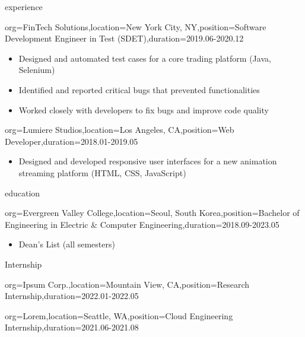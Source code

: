 \documentclass{resume}
\begin{document}
\begin{ResumeSection}{experience}
    \begin{ResumeSubsection}{org=FinTech Solutions,location={New York City, NY},position={Software Development Engineer in Test (SDET)},duration={2019.06-2020.12}}
        \begin{itemize}
            \item Designed and automated test cases for a core trading platform (Java, Selenium)  %
            \item Identified and reported critical bugs that prevented functionalities  %
            \item Worked closely with developers to fix bugs and improve code quality  %
        \end{itemize}
    \end{ResumeSubsection}
    \begin{ResumeSubsection}{org=Lumiere Studios,location={Los Angeles, CA},position={Web Developer},duration={2018.01-2019.05}}
        \begin{itemize}
            \item Designed and developed responsive user interfaces for a new animation streaming platform (HTML, CSS, JavaScript)  %
        \end{itemize}
    \end{ResumeSubsection}
\end{ResumeSection}

\begin{ResumeSection}{education}
    \begin{ResumeSubsection}{org={Evergreen Valley College},location={Seoul, South Korea},position={Bachelor of Engineering in Electric \& Computer Engineering},duration={2018.09-2023.05}}
        \begin{itemize}
            \item Dean's List (all semesters)  %
        \end{itemize}
    \end{ResumeSubsection}
\end{ResumeSection}

\begin{ResumeSection}{Internship}

    \begin{ResumeSubsection}{org={Ipsum Corp.},location={Mountain View, CA},position={Research Internship},duration={2022.01-2022.05}}
    \end{ResumeSubsection}

    \begin{ResumeSubsection}{org={Lorem},location={Seattle, WA},position={Cloud Engineering Internship},duration={2021.06-2021.08}}
    \end{ResumeSubsection}

\end{ResumeSection}
\end{document}

